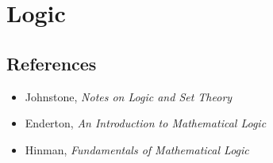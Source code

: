 \section{Logic}
\subsection*{References}
\begin{itemize}
    \item Johnstone, \emph{Notes on Logic and Set Theory}
    \item Enderton, \emph{An Introduction to Mathematical Logic}
    \item Hinman, \emph{Fundamentals of Mathematical Logic}
\end{itemize}
